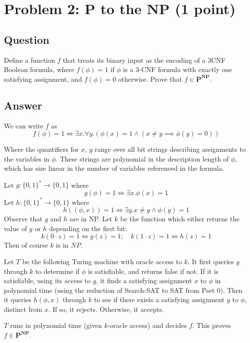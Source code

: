 \documentclass{article}
\renewcommand{\P}{\mathbf{P}}
\newcommand{\NP}{\mathbf{NP}}
\begin{document}
\newpage
\section*{Problem 2: P to the NP (1 point)}

\subsection*{Question}

Define a function $f$ that treats its binary input as the encoding of a 3CNF Boolean formula, where $f(\phi) = 1$ if $\phi$ is a 3-CNF formula with exactly one satisfying assignment, and $f(\phi) = 0$ otherwise. Prove that $f \in \P^{\NP}$.

\subsection*{Answer}

We can write $f$ as
$$
	f(\phi) = 1 \iff \exists x . \forall y . (\phi(x) = 1 \wedge (x \neq y \implies \phi(y) = 0))
$$

Where the quantifiers for $x$, $y$ range over all bit strings describing assignments to the variables in $\phi$.  These strings are polynomial in the description length of $\phi$, which has size linear in the number of variables referenced in the formula. 

Let $g : \{0, 1\}^* \to \{0, 1\}$ where
$$
g(\phi) = 1 \iff \exists x . \phi(x) = 1
$$
Let $h : \{0, 1\}^* \to \{0, 1\}$ where
$$
h((\phi, x)) = 1 \iff \exists y . x \neq y \wedge \phi(y) = 1
$$
Observe that $g$ and $h$ are in NP.
Let $k$ be the function which either returns the value of $g$ or $h$ depending on the first bit:
$$
k(0 \cdot z) = 1 \iff g(z) = 1 ; \quad k(1 \cdot z) = 1 \iff h(z) = 1
$$
Then of course $k$ is in $NP$.

Let $T$ be the following Turing machine with oracle access to $k$.  It first queries $g$ through $k$ to determine if $\phi$ is satisfiable, and returns false if not.  If it is satisfiable, using its access to $g$, it finds a satisfying assignment $x$ to $\phi$ in polynomial time (using the reduction of Search-SAT to SAT from Pset 0).  Then it queries $h(\phi, x)$ through $k$ to see if there exists a satisfying assignment $y$ to $\phi$, distinct from $x$.  If so, it rejects.  Otherwise, it accepts.

$T$ runs in polynomial time (given $k$-oracle access) and decides $f$.
This proves $f \in \P^\NP$.
\end{document}
